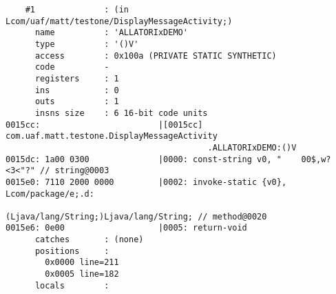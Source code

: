 \begin{lstlisting}
    #1              : (in Lcom/uaf/matt/testone/DisplayMessageActivity;)
      name          : 'ALLATORIxDEMO'
      type          : '()V'
      access        : 0x100a (PRIVATE STATIC SYNTHETIC)
      code          -
      registers     : 1
      ins           : 0
      outs          : 1
      insns size    : 6 16-bit code units
0015cc:                        |[0015cc] com.uaf.matt.testone.DisplayMessageActivity
                                         .ALLATORIxDEMO:()V
0015dc: 1a00 0300              |0000: const-string v0, "	00$,w?<3<"?" // string@0003
0015e0: 7110 2000 0000         |0002: invoke-static {v0}, Lcom/package/e;.d:
                                      (Ljava/lang/String;)Ljava/lang/String; // method@0020
0015e6: 0e00                   |0005: return-void
      catches       : (none)
      positions     :
        0x0000 line=211
        0x0005 line=182
      locals        :


\end{lstlisting}
